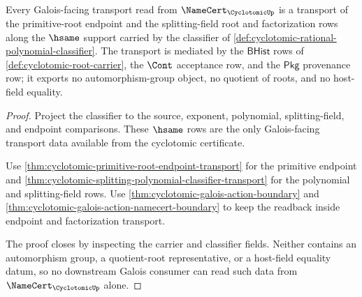 \begin{theorem}
\label{thm:cyclotomic-galois-transport-obligation}
Every Galois-facing transport read from $\NameCert_{\CyclotomicUp}$ is a transport of the primitive-root endpoint and the splitting-field root and factorization rows along the $\hsame$ support carried by the classifier of \autoref{def:cyclotomic-rational-polynomial-classifier}. The transport is mediated by the $\mathsf{BHist}$ rows of \autoref{def:cyclotomic-root-carrier}, the $\Cont$ acceptance row, and the $\mathsf{Pkg}$ provenance row; it exports no automorphism-group object, no quotient of roots, and no host-field equality.
\end{theorem}
\begin{proof}
Project the classifier to the source, exponent, polynomial, splitting-field, and endpoint comparisons. These $\hsame$ rows are the only Galois-facing transport data available from the cyclotomic certificate.

Use \autoref{thm:cyclotomic-primitive-root-endpoint-transport} for the primitive endpoint and \autoref{thm:cyclotomic-splitting-polynomial-classifier-transport} for the polynomial and splitting-field rows. Use \autoref{thm:cyclotomic-galois-action-boundary} and \autoref{thm:cyclotomic-galois-action-namecert-boundary} to keep the readback inside endpoint and factorization transport.

The proof closes by inspecting the carrier and classifier fields. Neither contains an automorphism group, a quotient-root representative, or a host-field equality datum, so no downstream Galois consumer can read such data from $\NameCert_{\CyclotomicUp}$ alone.
\end{proof}


